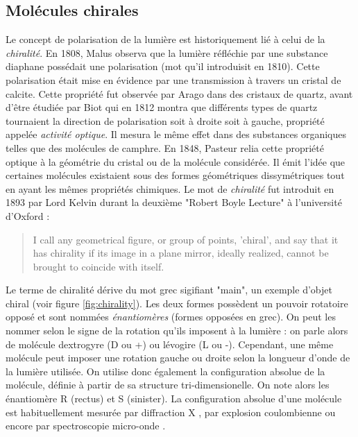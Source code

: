 \subsection{Molécules chirales}
Le concept de polarisation de la lumière est historiquement lié à celui de la \textit{chiralité}. En 1808, Malus observa que la lumière réfléchie par une substance diaphane possédait une polarisation (mot qu'il introduisit en 1810). Cette polarisation était mise en évidence par une transmission à travers un cristal de calcite. Cette propriété fut observée par Arago dans des cristaux de quartz, avant d'être étudiée par Biot qui en 1812 montra que différents types de quartz tournaient la direction de polarisation soit à droite soit à gauche, propriété appelée \textit{activité optique}. Il mesura le même effet dans des substances organiques telles que des molécules de camphre. En 1848, Pasteur relia cette propriété optique à la géométrie du cristal ou de la molécule considérée. Il émit l'idée que certaines molécules existaient sous des formes géométriques dissymétriques tout en ayant les mêmes propriétés chimiques. Le mot de \textit{chiralité} fut introduit en 1893 par Lord Kelvin durant la deuxième "Robert Boyle Lecture" à l'université d'Oxford  :
\begin{quotation}
I call any geometrical figure, or group of points, 'chiral', and say that it has chirality if its image in a plane mirror, ideally realized, cannot be brought to coincide with itself.
\end{quotation}
Le terme de chiralité dérive du mot grec sigifiant "main", un exemple d'objet chiral (voir figure \ref{fig:chirality}). Les deux formes possèdent un pouvoir rotatoire opposé et sont nommées \textit{énantiomères} (formes opposées en grec). On peut les nommer selon le signe de la rotation qu'ils imposent à la lumière : on parle alors de molécule dextrogyre (D ou +) ou lévogire (L ou -). Cependant, une même molécule peut imposer une rotation gauche ou droite selon la longueur d'onde de la lumière utilisée. On utilise donc également la configuration absolue de la molécule, définie à partir de sa structure tri-dimensionelle. On note alors les énantiomère R (rectus) et S (sinister). La configuration absolue d'une molécule est habituellement mesurée par diffraction X , par explosion coulombienne  ou encore par spectroscopie micro-onde .

